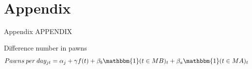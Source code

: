 \documentclass[8pt]{beamer}
\begin{document}
\appendix



\section{Appendix}


\begin{frame}{Appendix}
\vfill \centering APPENDIX
\end{frame}




\begin{frame}{Difference number in pawns}
    \[Pawns \: per \: day_{jt} = \alpha_j + \gamma f(t) + \beta_b \mathbbm{1}(t \in MB)_{t} +\beta_a \mathbbm{1}(t \in MA)_{t}\]
    
    \begin{table}[H]
\caption{Number of pawns balance before and after the experiment}
\label{num_pawns_bal}
\begin{center}
\small{}
\end{center}
\end{table}

\hyperlink{consort}{}
\end{frame}
\end{document}
